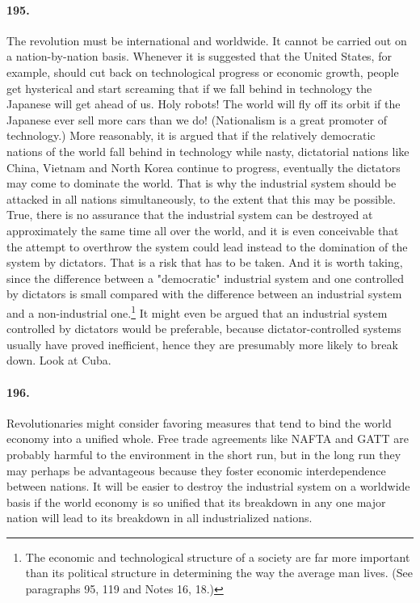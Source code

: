 \documentclass[12pt]{book}
\begin{document}
\paragraph{195.} The revolution must be international and worldwide. It cannot be carried out on a nation-by-nation basis. Whenever it is suggested that the United States, for example, should cut back on technological progress or economic growth, people get hysterical and start screaming that if we fall behind in technology the Japanese will get ahead of us. Holy robots!  The world will fly off its orbit if the Japanese ever sell more cars than we do! (Nationalism is a great promoter of technology.) More reasonably, it is argued that if the relatively democratic nations of the world fall behind in technology while nasty, dictatorial nations like China, Vietnam and North Korea continue to progress, eventually the dictators may come to dominate the world. That is why the industrial system should be attacked in all nations simultaneously, to the extent that this may be possible. True, there is no assurance that the industrial system can be destroyed at approximately the same time all over the world, and it is even conceivable that the attempt to overthrow the system could lead instead to the domination of the system by dictators. That is a risk that has to be taken. And it is worth taking, since the difference between a "democratic" industrial system and one controlled by dictators is small compared with the difference between an industrial system and a non-industrial one.\footnote{The economic and technological structure of a society are far more important than its political structure in determining the way the average man lives. (See paragraphs 95, 119 and Notes 16, 18.)} It might even be argued that an industrial system controlled by dictators would be preferable, because dictator-controlled systems usually have proved inefficient, hence they are presumably more likely to break down. Look at Cuba.


\paragraph{196.}  Revolutionaries might consider favoring measures that tend to bind the world economy into a unified whole. Free trade agreements like NAFTA and GATT are probably harmful to the environment in the short run, but in the long run they may perhaps be advantageous because they foster economic interdependence between nations. It will be easier to destroy the industrial system on a worldwide basis if the world economy is so unified that its breakdown in any one major nation will lead to its breakdown in all industrialized nations.
\end{document}
